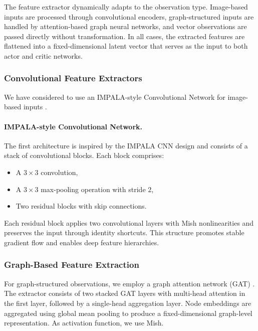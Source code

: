\documentclass{article}
\begin{document}
The feature extractor dynamically adapts to the observation type. Image-based inputs are processed through convolutional encoders, graph-structured inputs are handled by attention-based graph neural networks, and vector observations are passed directly without transformation. In all cases, the extracted features are flattened into a fixed-dimensional latent vector that serves as the input to both actor and critic networks.


\subsubsection{Convolutional Feature Extractors}

We have considered to use an IMPALA-style Convolutional Network for image-based inputs \cite{espeholt2018impala}.

\paragraph{IMPALA-style Convolutional Network.}
The first architecture is inspired by the IMPALA CNN design and consists of a stack of convolutional blocks. Each block comprises:
\begin{itemize}
    \item A $3 \times 3$ convolution,
    \item A $3 \times 3$ max-pooling operation with stride $2$,
    \item Two residual blocks with skip connections.
\end{itemize}

Each residual block applies two convolutional layers with Mish \cite{misra2019mish} nonlinearities and preserves the input through identity shortcuts. This structure promotes stable gradient flow and enables deep feature hierarchies.

\subsubsection{Graph-Based Feature Extraction}

For graph-structured observations, we employ a graph attention network (GAT) \cite{velickovic2017graph}. The extractor consists of two stacked GAT layers with multi-head attention in the first layer, followed by a single-head aggregation layer. Node embeddings are aggregated using global mean pooling to produce a fixed-dimensional graph-level representation. As activation function, we use Mish.
\end{document}
